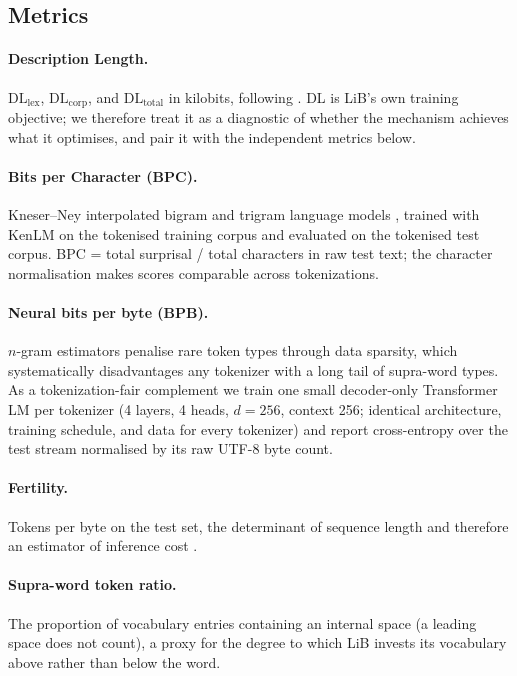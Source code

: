 \documentclass[pdflatex,sn-apa]{sn-jnl}
\begin{document}
\subsection{Metrics}

\paragraph{Description Length.}
$\mathrm{DL}_\mathrm{lex}$, $\mathrm{DL}_\mathrm{corp}$, and
$\mathrm{DL}_\mathrm{total}$ in kilobits, following \citet{yang2020less}.
DL is LiB's own training objective; we therefore treat it as a diagnostic of
whether the mechanism achieves what it optimises, and pair it with the
independent metrics below.

\paragraph{Bits per Character (BPC).}
Kneser--Ney interpolated bigram and trigram language models
\citep{kneser-ney-1995}, trained with KenLM \citep{heafield2011kenlm} on the
tokenised training corpus and evaluated on the tokenised test corpus.
BPC = total surprisal / total characters in raw test text; the
character normalisation makes scores comparable across tokenizations.

\paragraph{Neural bits per byte (BPB).}
$n$-gram estimators penalise rare token types through data sparsity, which
systematically disadvantages any tokenizer with a long tail of supra-word
types.
As a tokenization-fair complement we train one small decoder-only Transformer LM per
tokenizer (4 layers, 4 heads, $d{=}256$, context 256; identical architecture,
training schedule, and data for every tokenizer) and report cross-entropy
over the test stream normalised by its raw UTF-8 byte count.

\paragraph{Fertility.}
Tokens per byte on the test set, the determinant of sequence length and therefore an estimator of inference cost \citep{liu2025superbpe}.

\paragraph{Supra-word token ratio.}
The proportion of vocabulary entries containing an internal space
(a leading space does not count), a proxy for the degree to which
LiB invests its vocabulary above rather than below the word.
\end{document}
